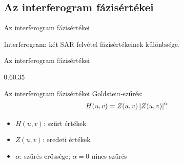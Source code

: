 \documentclass[aspectratio=169]{beamer}
\begin{document}
\def\ft{Az interferogram fázisértékei}
\subsection{\ft}


\begin{frame}{\ft}
    \begin{minic}{0.6}
        \centering
        
        Interferogram: két SAR felvétel fázisértékeinek különbsége.
    \end{minic}
\end{frame}


\begin{frame}{\ft}
    \begin{figp}{}{}{0.6}{0.35}
        
    \end{figp}
\end{frame}


\begin{frame}{\ft}
    Goldstein-szűrés:
    \[
        H(u,v) = Z(u,v) \left|Z(u,v)\right|^{\alpha}
    \]
    \begin{itemize}
        \item $H(u,v)$: szűrt értékek
        \item $Z(u,v)$: eredeti értékek
        \item $\alpha$: szűrés erőssége; $\alpha = 0$ nincs szűrés
    \end{itemize}
\end{frame}

%
\end{document}
